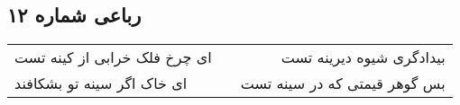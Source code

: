 \begin{center}
\section*{رباعی شماره ۱۲}
\label{sec:sh012}
\begin{longtable}{l p{0.5cm} r}
ای چرخ فلک خرابی از کینه تست
&&
بیدادگری شیوه دیرینه تست
\\
ای خاک اگر سینه تو بشکافند
&&
بس گوهر قیمتی که در سینه تست
\\
\end{longtable}
\end{center}
